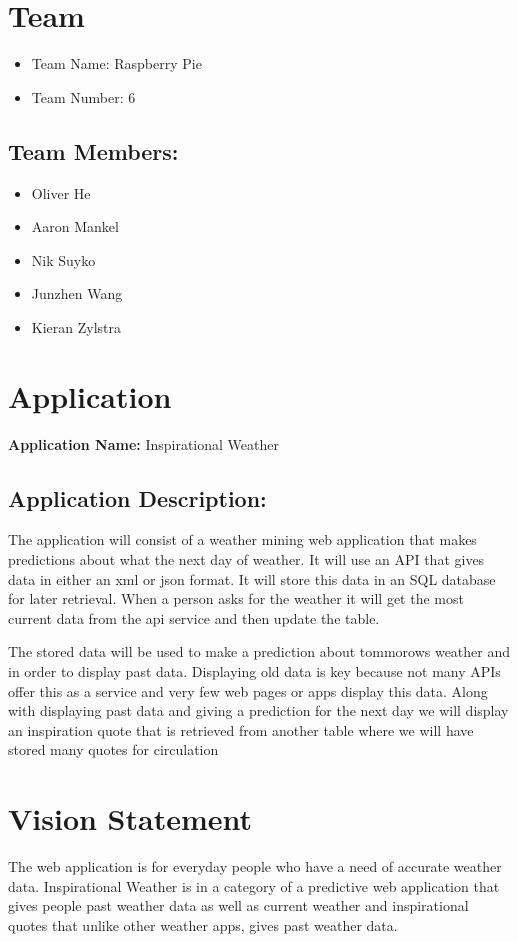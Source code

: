 \documentclass{article}
\begin{document}
	\section*{Team}
		\begin{itemize}
			\item Team Name: Raspberry Pie
			\item Team Number: 6 
		\end{itemize}
		\subsection*{Team Members:}
		\begin{itemize}
			\item Oliver He
			\item Aaron Mankel
			\item Nik Suyko
			\item Junzhen Wang
			\item Kieran Zylstra
		\end{itemize}
	\section*{Application}
	\textbf{Application Name:} Inspirational Weather
	\subsection*{Application Description:}
	The application will consist of a weather mining web application
	that makes predictions about what the next day of weather. It will use an
	API that gives data in either an xml or json format. It will store this data
	in an SQL database for later retrieval. When a person asks for the weather it
	will get the most current data from the api service and then update the table.
	\par
	The stored data will be used to make a prediction about tommorows
	weather and in order to display past data. Displaying old data is key because
	not many APIs offer this as a service and very few web pages or apps display
	this data. Along with displaying past data and giving a prediction for the next
	day we will display an inspiration quote that is retrieved from another table
	where we will have stored many quotes for circulation
	\section*{Vision Statement}
	The web application is for everyday people who have a need
	of accurate weather data. Inspirational Weather is in a category of a predictive
	web application that gives people past weather data as well as current weather
	and inspirational quotes that unlike other weather apps, gives past weather data.
\end{document}
